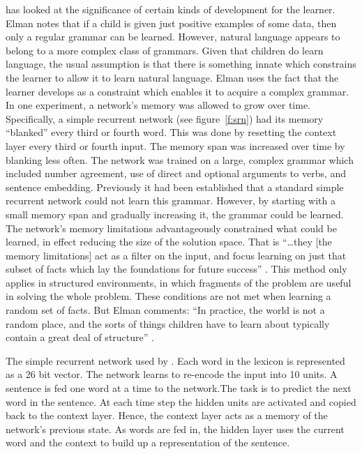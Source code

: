  has looked at the significance of certain kinds of
development for the learner.  Elman notes that if a child is given just
positive examples of some data, then only a regular grammar can be learned.
 However, natural language appears to belong to a more complex class of
grammars.  Given that children do learn language, the usual assumption is
that there is something innate which constrains the learner to allow it to
learn natural language.  Elman uses the fact that the
learner develops as a constraint which enables it to acquire a
complex grammar.  In one experiment, a network's memory was allowed to grow
over time. Specifically, a simple recurrent network (see
figure~\ref{f:srn}) had its memory ``blanked'' every third or fourth word.
This was done by resetting the context layer every third or fourth input.
The memory span was
increased over time by blanking less often. The network was trained on a
large, complex grammar which included number agreement, use of direct
and optional arguments to verbs, and sentence embedding.  Previously it
had been established that a standard simple recurrent network could not
learn this grammar.  However, by starting with a small memory span and
gradually increasing it, the grammar could be learned.
The network's
memory limitations advantageously constrained what could be learned, in
effect reducing the size of the solution space.
That is ``\ldots they [the memory limitations] act as a filter on the
input, and focus learning on just that subset of facts which lay the
foundations for future success'' \cite[p.~8]{elmaincr}.
This method only applies in structured
environments, in which fragments of the problem are useful in solving the
whole problem. These conditions are not met when learning a random set
of facts.  But Elman comments: ``In practice, the world is not a random
place, and the sorts of things children have to learn about typically
contain a great deal of structure'' \citeyear[p.~9]{elmaincr}.

\begin{fancyfigure}
\centerline{}
\caption{The simple recurrent network used by \protect{}.
Each word in the lexicon is represented as a 26 bit vector.
The network
learns to re-encode the input into 10 units.  A sentence is fed one word at
a time
to the network.The task is to
predict the next word in the sentence.
At each time step the hidden units are activated and
copied back to the context layer.  Hence, the context layer acts as a
memory of the network's
previous state.  As words are fed in, the hidden layer
uses the current word and the context to build up a representation of the
sentence.}\label{f:srn}
\end{fancyfigure}


